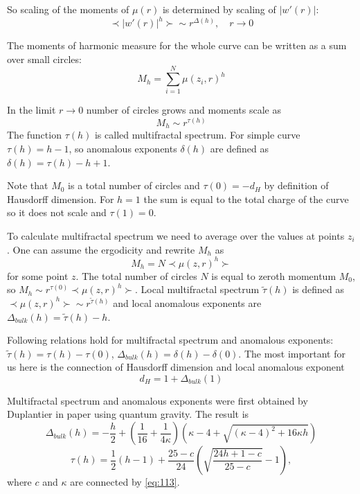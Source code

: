 \documentclass[12pt]{article}
\begin{document}
So scaling of the moments of $\mu(r)$ is determined by scaling of $|w'(r)|$:
\begin{equation}
  \label{eq:117}
  \prec |w'(r)|^{h}\succ \sim r^{\Delta(h)}, \quad r\to 0
\end{equation}

The moments of harmonic measure for the whole curve can be written as a sum over small circles:
\begin{equation}
  \label{eq:120}
  M_{h}=\sum_{i=1}^{N} \mu(z_{i},r)^{h}
\end{equation}

In the limit $r\to 0$ number of circles grows and moments scale as
\begin{equation}
  \label{eq:121}
  M_{h}\sim r^{\tau(h)}
\end{equation}
The function $\tau(h)$ is called multifractal spectrum. For simple curve $\tau(h)=h-1$, so anomalous
exponents $\delta(h)$ are defined as $\delta(h)=\tau(h)-h+1$. 

Note that $M_{0}$ is a total number of circles and $\tau(0)=-d_{H}$ by definition of Hausdorff
dimension. For $h=1$ the sum is equal to the total charge of the curve so it does not scale and
$\tau(1)=0$. 

To calculate multifractal spectrum we need to average over the values at points $z_{i}$. One can
assume the ergodicity and rewrite $M_{h}$ as
\begin{equation}
  \label{eq:122}
  M_{h}=N \prec \mu(z,r)^{h}\succ
\end{equation}
for some point $z$. The total number of circles $N$ is equal to zeroth momentum $M_{0}$, so
$M_{h}\sim r^{\tau(0)} \prec \mu(z,r)^{h}\succ$. Local multifractal spectrum $\tilde\tau(h)$ is
defined as $ \prec \mu(z,r)^{h}\succ\sim r^{\tilde\tau(h)}$ and local anomalous exponents are
$\Delta_{bulk}(h)=\tilde\tau(h) -h$.

Following relations hold for multifractal spectrum and anomalous exponents:
$\tilde\tau(h)=\tau(h)-\tau(0)$, $\Delta_{bulk}(h)=\delta(h)-\delta(0)$. The most important for us
here is the connection of Hausdorff dimension and local anomalous exponent 
\begin{equation}
  \label{eq:150}
  d_{H}=1+\Delta_{bulk}(1)
\end{equation}

Multifractal spectrum and anomalous exponents were first obtained by Duplantier in paper
\cite{duplantier2000conformally} using quantum gravity. The result is
\begin{equation}
  \label{eq:123}
  \Delta_{bulk}(h)=-\frac{h}{2}+\left(\frac{1}{16}+\frac{1}{4\kappa}\right)
  (\kappa-4+\sqrt{(\kappa-4)^{2}+16\kappa h})
\end{equation}
\begin{equation}
  \label{eq:124}
  \tau(h)=\frac{1}{2}(h-1) +\frac{25-c}{24}\left(\sqrt{\frac{24 h +1-c}{25-c}}-1\right), 
\end{equation}
where $c$ and $\kappa$ are connected by \eqref{eq:113}.
\end{document}
